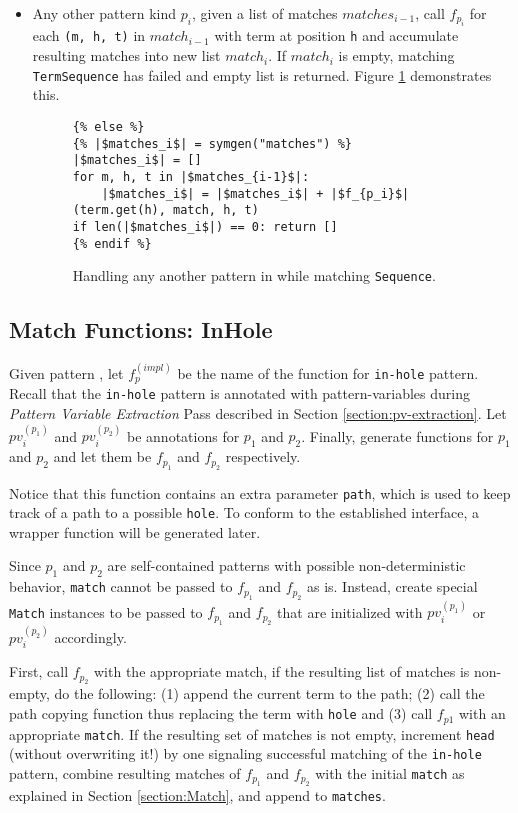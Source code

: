\begin{itemize}
\item Any other pattern kind $p_i$, given a list of matches $matches_{i-1}$, call $f_{p_i}$ for each \texttt{(m, h, t)} in $match_{i-1}$ with term at position \texttt{h} and accumulate resulting matches into new list $match_{i}$. If $match_{i}$ is empty, matching \texttt{TermSequence} has failed and empty list is returned. Figure \ref{codegen-pattern-seq-4} demonstrates this.

\begin{figure}[htb]
\begin{verbatim}
{% else %}
{% |$matches_i$| = symgen("matches") %}
|$matches_i$| = []
for m, h, t in |$matches_{i-1}$|:
	|$matches_i$| = |$matches_i$| + |$f_{p_i}$|(term.get(h), match, h, t)
if len(|$matches_i$|) == 0: return []
{% endif %}
\end{verbatim}
\caption{Handling any another pattern in \PatternSequenceNoArg \space while matching \texttt{Sequence}.}
\label{codegen-pattern-seq-4}
\end{figure}
\end{itemize}

\subsection{Match Functions: InHole}
Given pattern \PatternInHole, let $f_p^{(impl)}$ be the name of the function for \texttt{in-hole} pattern. Recall that the \texttt{in-hole} pattern is annotated with pattern-variables during \textit{Pattern Variable Extraction} Pass described in Section \ref{section:pv-extraction}. Let $pv_i^{(p_1)}$ and $pv_i^{(p_2)}$ be annotations for $p_1$ and $p_2$. Finally, generate functions for $p_1$ and $p_2$ and let them be $f_{p_1}$ and $f_{p_2}$ respectively.

Notice that this function contains an extra parameter \texttt{path}, which is used to keep track of a path to a possible \texttt{hole}. To conform to the established interface, a wrapper function will be generated later.

Since $p_1$ and $p_2$ are self-contained patterns with possible non-deterministic behavior, \texttt{match} cannot be passed to $f_{p_1}$ and $f_{p_2}$ as is. Instead, create special \texttt{Match} instances to be passed to $f_{p_1}$ and $f_{p_2}$ that are initialized with $pv_i^{(p_1)}$ or $pv_i^{(p_2)}$ accordingly.

First, call $f_{p_2}$ with the appropriate match, if the resulting list of matches is non-empty, do the following: (1) append the current term to the path; (2) call the path copying function thus replacing the term with \texttt{hole} and (3) call $f_{p1}$ with an appropriate \texttt{match}. If the resulting set of matches is not empty, increment \texttt{head} (without overwriting it!) by one signaling successful matching of the \texttt{in-hole} pattern, combine resulting matches of $f_{p_1}$ and $f_{p_2}$ with the initial \texttt{match} as explained in Section \ref{section:Match}, and append to \texttt{matches}.

